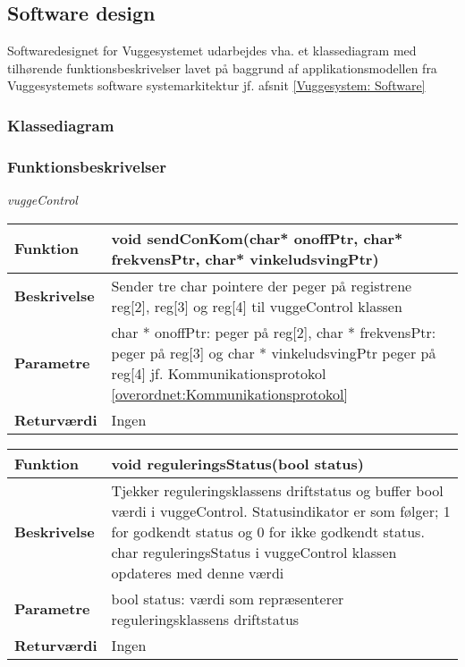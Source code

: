 \newpage
\subsection{Software design}
Softwaredesignet for Vuggesystemet udarbejdes vha. et klassediagram med tilhørende funktionsbeskrivelser lavet på baggrund af applikationsmodellen fra Vuggesystemets software systemarkitektur jf. afsnit \ref{Vuggesystem: Software}

\subsubsection*{Klassediagram}

\subsubsection*{Funktionsbeskrivelser}
\textit{vuggeControl} \\
\begin{center}
    \begin{tabular}{ | l | p{10cm} |} 
    \hline
    \textbf{Funktion}	 	& void sendConKom(char* onoffPtr, char* frekvensPtr, char* vinkeludsvingPtr)	\\ \hline
    \textbf{Beskrivelse} 	& Sender tre char pointere der peger på registrene reg[2], reg[3] og reg[4] til vuggeControl klassen					\\ \hline
    \textbf{Parametre}		& char * onoffPtr: peger på reg[2], char * frekvensPtr: peger på reg[3] og char * vinkeludsvingPtr peger på reg[4]	jf. Kommunikationsprotokol \ref{overordnet:Kommunikationsprotokol}	\\ \hline
    \textbf{Returværdi} 	& Ingen		 												\\ \hline
    \end{tabular}
\end{center}

\begin{center}
    \begin{tabular}{ | l | p{10cm} |}
    \hline
    \textbf{Funktion}	 	& void reguleringsStatus(bool status)							\\ \hline
    \textbf{Beskrivelse} 	& Tjekker reguleringsklassens driftstatus og buffer bool værdi i vuggeControl. Statusindikator er som følger; 1 for godkendt status og 0 for ikke godkendt status. char reguleringsStatus i vuggeControl klassen opdateres med denne værdi				\\ \hline
    \textbf{Parametre}		& bool status: værdi som repræsenterer reguleringsklassens driftstatus							 		\\ \hline
    \textbf{Returværdi} 	& Ingen		 												\\ \hline
    \end{tabular}
\end{center}


